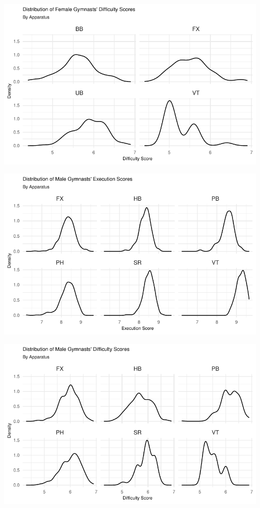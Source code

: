 \documentclass[
  letterpaper,
  DIV=11,
  numbers=noendperiod]{scrartcl}
\begin{document}
\includegraphics{Main_files/figure-pdf/execution-difficulty-distributions-2.pdf}

\includegraphics{Main_files/figure-pdf/execution-difficulty-distributions-3.pdf}

\includegraphics{Main_files/figure-pdf/execution-difficulty-distributions-4.pdf}
\end{document}
